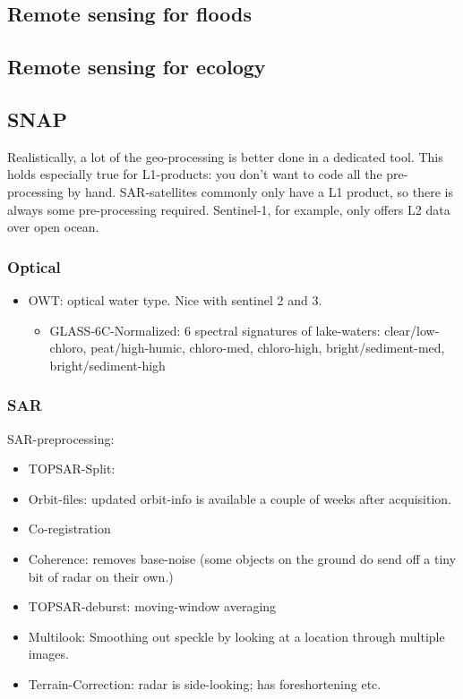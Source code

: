\subsection{Remote sensing for floods}

\subsection{Remote sensing for ecology}


\subsection{SNAP}
Realistically, a lot of the geo-processing is better done in a dedicated tool.
This holds especially true for L1-products: you don't want to code all the pre-processing by hand.
SAR-satellites commonly only have a L1 product, so there is always some pre-processing required. 
Sentinel-1, for example, only offers L2 data over open ocean.


\subsubsection{Optical}

\begin{itemize}
    \item OWT: optical water type. Nice with sentinel 2 and 3. \begin{itemize}
        \item GLASS-6C-Normalized: 6 spectral signatures of lake-waters: clear/low-chloro, peat/high-humic, chloro-med, chloro-high, bright/sediment-med, bright/sediment-high
    \end{itemize}
\end{itemize}

\subsubsection{SAR}

SAR-preprocessing:
\begin{itemize}
    \item TOPSAR-Split: 
    \item Orbit-files: updated orbit-info is available a couple of weeks after acquisition.
    \item Co-registration
    \item Coherence: removes base-noise (some objects on the ground do send off a tiny bit of radar on their own.)
    \item TOPSAR-deburst: moving-window averaging
    \item Multilook: Smoothing out speckle by looking at a location through multiple images.
    \item Terrain-Correction: radar is side-looking; has foreshortening etc. 
\end{itemize}

